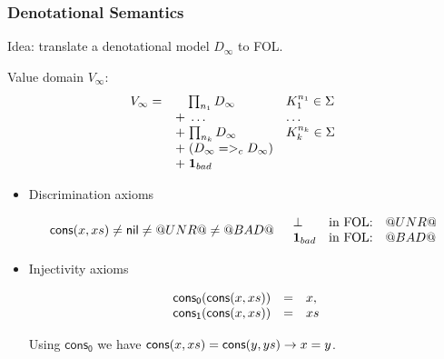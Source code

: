\documentclass[serif,professionalfont]{beamer}
\begin{document}
\begin{frame}[fragile]
  \frametitle{Denotational Semantics}

  Idea: translate a denotational model
  $D_\infty$     %
  to FOL.

  Value domain $V_{\infty}$:
    \[V_{\infty} = \begin{array}[t]{ll}
             \quad\;{\prod_{n_1}{D_{\infty}}} & K_1^{n_1} \in \Sigma \\
             \; + \;\ldots                    & \ldots \\
             \; + \;{\prod_{n_k}{D_{\infty}}} & K_k^{n_k} \in \Sigma \\
             \; + \;(D_{\infty} =>_c D_{\infty}) \\
             \; + \;{\sf{\bf 1}}_{bad} \quad
    \end{array}\]

  \begin{itemize}
    \item Discrimination axioms

    \[\begin{array}{cc}

      \mathsf{cons}(x,xs) \neq \mathsf{nil} \neq @UNR@ \neq @BAD@

      &

      \begin{array}{lll }
      \bot          & \text{in FOL:} & @UNR@\\
      {\sf{\bf 1}}_{bad} & \text{in FOL:} & @BAD@
      \end{array}
    \end{array}\]

    \item Injectivity axioms

    \[\begin{array}{lcl}
      \mathsf{cons_0}(\mathsf{cons}(x,xs)) & = & x, \\
      \mathsf{cons_1}(\mathsf{cons}(x,xs)) & = & xs
    \end{array}\]

    Using $\mathsf{cons_0}$ we have $\mathsf{cons}(x,xs) = \mathsf{cons}(y,ys) \to x = y$.
  \end{itemize}

\end{frame}
\end{document}
